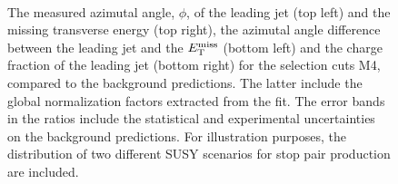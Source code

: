 \begin{figure}[!ht]
\begin{center}
{    }
    \mbox{
    }
  \end{center}
  \caption[Kinematic distributions of the azimutal angle, $\phi$, of the leading jet and the missing transverse energy, the azimutal angle difference between the leading jet and the $\met$, and the charge fraction of the leading jet in the signal regions for the selection cuts of region M4, after the normalization factors extracted from the fit have been applied.]
{The measured azimutal angle, $\phi$, of the leading jet (top left) and the missing transverse energy (top right), the azimutal angle difference between the leading jet and the $\met$ (bottom left) and the charge fraction of the leading jet (bottom right) for the selection cuts M4, compared to the background predictions. The latter include the global normalization factors extracted from the fit. The error bands in the ratios include the statistical and experimental uncertainties on the background predictions. For illustration purposes, the distribution of two different SUSY scenarios for stop pair production are included.}
  \label{fig:Plot_M4_SR_Jet1}
\end{figure}

